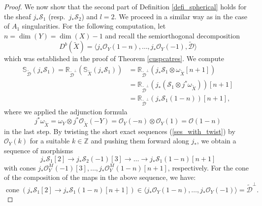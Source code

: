 \documentclass[a4paper, twoside, 11pt]{amsart}
\theoremstyle{definition}
\theoremstyle{remark}
\numberwithin{equation}{theorem}
\DeclareMathOperator{\cone}{cone}
\begin{document}
\begin{proof}
    We now show that the second part of Definition \ref{defi_spherical} holds for the sheaf $j_*\mathcal{S}_1$ (resp.\ $j_*\mathcal{S}_2$) and $l=2$.
	We proceed in a similar way as \cite[Lemma 5.10(iii)]{categorical_absorptions} in the case of $A_1$ singularities. 
	For the following computation, let $n = \dim(Y) = \dim(X)-1$ and recall the semiorthogonal decomposition 
    \begin{equation}
		D^b(\widetilde{X})= \langle j_*\mathcal{O}_Y(1-n),\dots, j_*\mathcal{O}_Y(-1),\widetilde{\mathcal{D}}\rangle
	\end{equation}
    which was established in the proof of Theorem \ref{cuspcatres}. We compute 
	\begin{equation}\label{Serre_comp}
		\begin{aligned}
			\mathbb{S}_{\widetilde{\mathcal{D}}}(j_*\mathcal{S}_1) = \mathbb{R}_{\widetilde{\mathcal{D}}^\perp}(\mathbb{S}_{\widetilde{X}}(j_*\mathcal{S}_1)) & = \mathbb{R}_{\widetilde{\mathcal{D}}^\perp} (j_*\mathcal{S}_1 \otimes \omega_{\widetilde{X}}[n+1]) \\
			& = \mathbb{R}_{\widetilde{\mathcal{D}}^\perp}(j_*(\mathcal{S}_1 \otimes j^*\omega_{\widetilde{X}}))[n+1] \\
			& = \mathbb{R}_{\widetilde{\mathcal{D}}^\perp}(j_*\mathcal{S}_1(1-n))[n+1],
		\end{aligned}
	\end{equation}
	where we applied the adjunction formula  
	\begin{equation*}
		j^*\omega_{\widetilde{X}} = \omega_{Y} \otimes j^*\mathcal{O}_{\widetilde{X}}(-Y) = \mathcal{O}_Y(-n) \otimes \mathcal{O}_Y(1) = \mathcal{O}(1-n)
	\end{equation*}
	in the last step. By twisting the short exact sequences (\ref{ses_with_twist}) by $\mathcal{O}_Y(k)$ for a suitable $k\in \mathbb{Z}$ and pushing them forward along $j_*$, we obtain a sequence of morphisms
	\begin{equation}\label{composition}
		j_*\mathcal{S}_1[2] \longrightarrow j_*\mathcal{S}_2(-1)[3] \longrightarrow \dots \longrightarrow j_*\mathcal{S}_1(1-n)[n+1]
	\end{equation} 
	with cones $j_*\mathcal{O}_Y^M(-1)[3], \dots,j_*\mathcal{O}_Y^M(1-n)[n+1]$, respectively. For the cone of the composition of the maps in the above sequence, we have: 
	\begin{equation*}
		\cone(j_*\mathcal{S}_1[2] \longrightarrow j_*\mathcal{S}_1(1-n)[n+1]) \in \langle j_*\mathcal{O}_Y(1-n),\dots, j_*\mathcal{O}_Y(-1) \rangle = \widetilde{\mathcal{D}}^\perp.

\end{equation*}
\end{proof}
\end{document}
